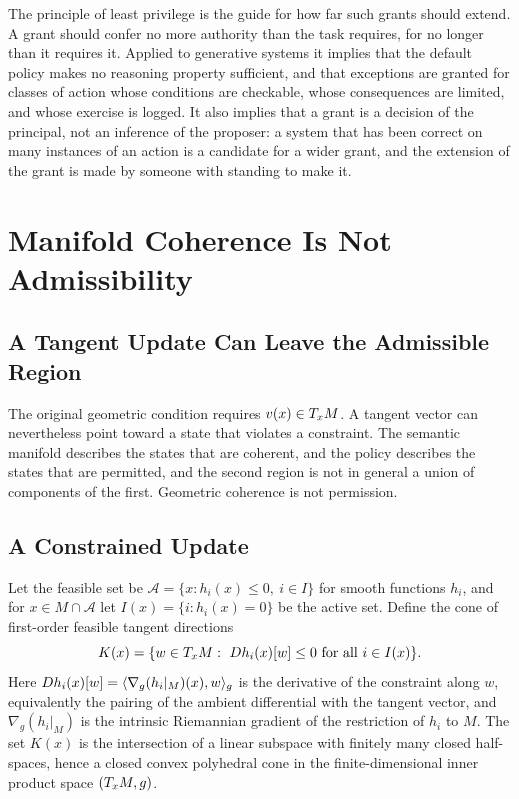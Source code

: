 The principle of least privilege \cite{saltzer1975} is the guide for how far such grants should extend. A grant should confer no more authority than the task requires, for no longer than it requires it. Applied to generative systems it implies that the default policy makes no reasoning property sufficient, and that exceptions are granted for classes of action whose conditions are checkable, whose consequences are limited, and whose exercise is logged. It also implies that a grant is a decision of the principal, not an inference of the proposer: a system that has been correct on many instances of an action is a candidate for a wider grant, and the extension of the grant is made by someone with standing to make it.

\chapter{Manifold Coherence Is Not Admissibility}
\label{ch:admissible-projection}

\section{A Tangent Update Can Leave the Admissible Region}

The original geometric condition requires $v(x)\in T_xM$. A tangent vector can nevertheless point toward a state that violates a constraint. The semantic manifold describes the states that are coherent, and the policy describes the states that are permitted, and the second region is not in general a union of components of the first. Geometric coherence is not permission.

\section{A Constrained Update}

Let the feasible set be $\mathcal A=\{x: h_i(x)\le0,\ i\in I\}$ for smooth functions $h_i$, and for $x\in M\cap\mathcal A$ let $I(x)=\{i:h_i(x)=0\}$ be the active set. Define the cone of first-order feasible tangent directions
\[
K(x)=\{w\in\Tan_xM:\ Dh_i(x)[w]\le0\ \text{for all } i\in I(x)\}.
\]
Here $Dh_i(x)[w]=\langle \nabla_g(h_i|_M)(x),w\rangle_g$ is the derivative of the constraint along $w$, equivalently the pairing of the ambient differential with the tangent vector, and $\nabla_g(h_i|_M)$ is the intrinsic Riemannian gradient of the restriction of $h_i$ to $M$. The set $K(x)$ is the intersection of a linear subspace with finitely many closed half-spaces, hence a closed convex polyhedral cone in the finite-dimensional inner product space $(T_xM,g)$.

